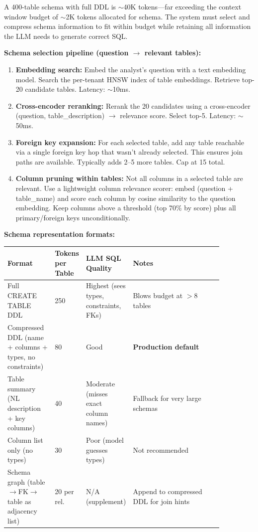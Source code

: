 A 400-table schema with full DDL is $\sim$40K tokens---far exceeding the context window budget of $\sim$2K tokens allocated for schema. The system must select and compress schema information to fit within budget while retaining all information the LLM needs to generate correct SQL.

\textbf{Schema selection pipeline (question $\rightarrow$ relevant tables):}

\begin{enumerate}
  \item \textbf{Embedding search:} Embed the analyst's question with a text embedding model. Search the per-tenant HNSW index of table embeddings. Retrieve top-20 candidate tables. Latency: $\sim$10ms.
  \item \textbf{Cross-encoder reranking:} Rerank the 20 candidates using a cross-encoder (question, table\_description) $\rightarrow$ relevance score. Select top-5. Latency: $\sim$50ms.
  \item \textbf{Foreign key expansion:} For each selected table, add any table reachable via a single foreign key hop that wasn't already selected. This ensures join paths are available. Typically adds 2--5 more tables. Cap at 15 total.
  \item \textbf{Column pruning within tables:} Not all columns in a selected table are relevant. Use a lightweight column relevance scorer: embed (question + table\_name) and score each column by cosine similarity to the question embedding. Keep columns above a threshold (top 70\% by score) plus all primary/foreign keys unconditionally.
\end{enumerate}

\textbf{Schema representation formats:}

\begin{tabular}{|p{0.22\linewidth}|p{0.10\linewidth}|p{0.12\linewidth}|p{0.42\linewidth}|}
\hline
\textbf{Format} & \textbf{Tokens per Table} & \textbf{LLM SQL Quality} & \textbf{Notes} \\
\hline
Full CREATE TABLE DDL & 250 & Highest (sees types, constraints, FKs) & Blows budget at $>$8 tables \\
\hline
Compressed DDL (name + columns + types, no constraints) & 80 & Good & \textbf{Production default} \\
\hline
Table summary (NL description + key columns) & 40 & Moderate (misses exact column names) & Fallback for very large schemas \\
\hline
Column list only (no types) & 30 & Poor (model guesses types) & Not recommended \\
\hline
Schema graph (table$\rightarrow$FK$\rightarrow$table as adjacency list) & 20 per rel. & N/A (supplement) & Append to compressed DDL for join hints \\
\hline
\end{tabular}

